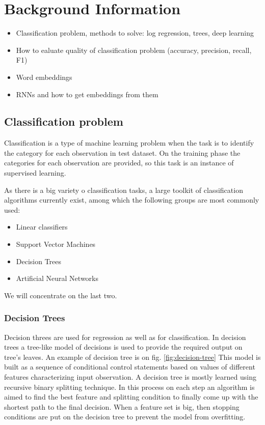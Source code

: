 \chapter{Background Information}
\label{ch:background-information}


\begin{itemize}
    \item Classification problem, methods to solve: log regression, trees, deep learning
    \item How to ealuate quality of classification problem (accuracy, precision, recall, F1)
    \item Word embeddings
    \item RNNs and how to get embeddings from them
\end{itemize}

\section{Classification problem}
Classification is a type of machine learning problem when the task is to identify the category  for each observation in test dataset. On the training phase the categories for each observation are provided, so this task is an instance of supervised learning.

As there is a big variety o classification tasks, a large toolkit of classification algorithms currently exist, among which the following groups are most commonly used: 
\begin{itemize}
 \item Linear classifiers
 \item Support Vector Machines
 \item Decision Trees
 \item Artificial Neural Networks
\end{itemize} 

We will concentrate on the last two.

\subsection{Decision Trees}
Decision threes are used for regression as well as for classification. In decision trees a tree-like model of decisions is used to provide the required output on tree's leaves. An example of decision tree is on fig. \ref{fig:decision-tree} This model is built as a sequence of conditional control statements based on values of different features characterizing input observation. A decision tree is mostly learned using recursive binary splitting technique. In this process on each step an algorithm is aimed to find the best feature and splitting condition to finally come up with the shortest path to the final decision. When a feature set is big, then stopping conditions are put on the decision tree to prevent the model from overfitting. 

